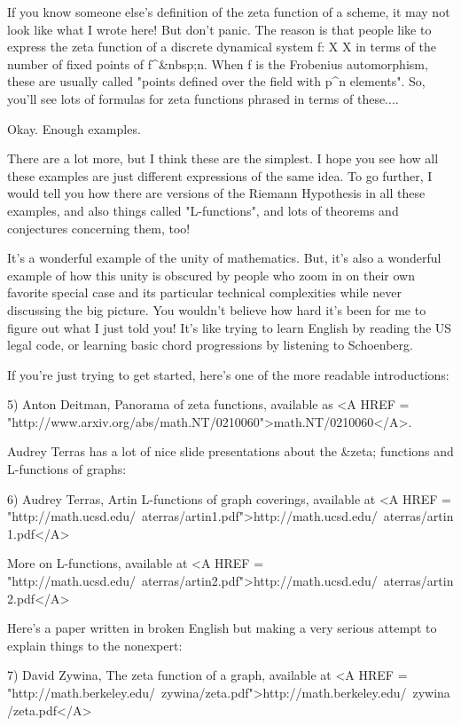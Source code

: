 If you know someone else's definition of the zeta function of a scheme, 
it may not look like what I wrote here!   But don't panic.  The reason is 
that people like to express the zeta function of a discrete dynamical system 
f: X \to  X in terms of the number of fixed points of f^{&nbsp;n}.  
When f is the 
Frobenius automorphism, these are usually called "points defined over the 
field with p^{n} elements".  So, you'll see lots of formulas for 
zeta functions phrased in terms of these....

Okay.  Enough examples.

There are a lot more, but I think these are the simplest.  I hope you see 
how all these examples are just different expressions of the same idea.
To go further, I would tell you how there are versions of the Riemann 
Hypothesis in all these examples, and also things called "L-functions", 
and lots of theorems and conjectures concerning them, too!  

It's a wonderful example of the unity of mathematics.  But, it's also
a wonderful example of how this unity is obscured by people who zoom 
in on their own favorite special case and its particular technical 
complexities while never discussing the big picture.  You wouldn't 
believe how hard it's been for me to figure out what I just told you! 
It's like trying to learn English by reading the US legal code, or
learning basic chord progressions by listening to Schoenberg.  

If you're just trying to get started, here's one of the more readable 
introductions:

5) Anton Deitman, Panorama of zeta functions, available as 
<A HREF = "http://www.arxiv.org/abs/math.NT/0210060">math.NT/0210060</A>.

Audrey Terras has a lot of nice slide presentations about the &zeta; functions 
and L-functions of graphs:

6) Audrey Terras, Artin L-functions of graph coverings, 
available at 
<A HREF = "http://math.ucsd.edu/~aterras/artin1.pdf">http://math.ucsd.edu/~aterras/artin1.pdf</A>

More on L-functions, available at 
<A HREF = "http://math.ucsd.edu/~aterras/artin2.pdf">http://math.ucsd.edu/~aterras/artin2.pdf</A>

Here's a paper written in broken English but making a very serious attempt 
to explain things to the nonexpert:

7) David Zywina, The zeta function of a graph, available at
<A HREF = "http://math.berkeley.edu/~zywina/zeta.pdf">http://math.berkeley.edu/~zywina/zeta.pdf</A>

